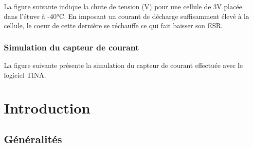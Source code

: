 La figure suivante indique la chute de tension (V) pour une cellule de 3V placée dans l'étuve à -40°C. 
En imposant un courant de décharge suffisamment élevé à la cellule, le coeur de cette dernière se réchauffe ce qui fait baisser son ESR.









\subsection{Simulation du capteur de courant}

La figure suivante présente la simulation du capteur de courant effectuée avec le logiciel TINA.


\newpage
{}%

 \chapter{Introduction}
 
\section{Généralités}

